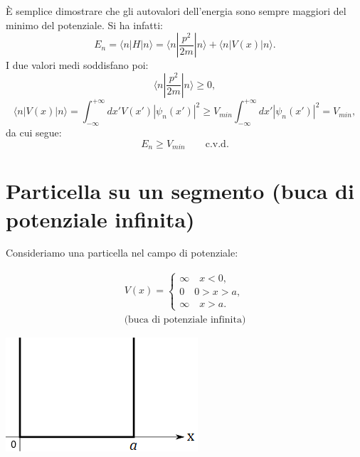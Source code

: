 \documentclass[a4paper,12pt,twoside]{book}
\begin{document}
È semplice dimostrare che gli autovalori dell'energia sono sempre maggiori del minimo del potenziale. Si ha infatti:
\begin{equation}
E_n = \langle n | H |n \rangle = \langle n | \frac{p^2}{2m} |n \rangle + \langle n | V(x) |n \rangle.
\end{equation}
I due valori medi soddisfano poi:
\begin{equation}
\langle n | \frac{p^2}{2m} |n \rangle \geq 0,
\end{equation}
\begin{equation}
\langle n | V(x) |n \rangle = \int _{-\infty} ^{+\infty} dx' V(x')|\psi _n(x')|^2 \geq V_{min} \int _{-\infty} ^{+\infty} dx' |\psi _n(x')|^2 = V_{min},
\end{equation}
da cui segue:
\begin{equation}
E_n \geq V_{min} \qquad \textrm{c.v.d.}
\end{equation}
\section{Particella su un segmento (buca di potenziale infinita)}
Consideriamo una particella nel campo di potenziale:\\

\begin{minipage}{.5\textwidth}
\begin{align}
V(x)= 
\begin{cases}
\infty \quad x<0,\\
0 \quad 0>x>a, \\
\infty \quad x>a.
\end{cases}
\\
\textrm{(buca di potenziale infinita)} \nonumber
\end{align}	
\end{minipage}
\hspace{.5cm}
\begin{minipage}{.4\textwidth}
\includegraphics[width=\textwidth]{immagini/cap_10/fig_10_1.png}
\end{minipage}\\
\end{document}
